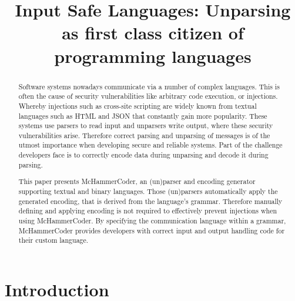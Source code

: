 \documentclass[conference]{IEEEtran}
\newcommand{\punchline}[1]{\textbf{Punch line: #1}}
\renewcommand{\punchline}[1]{}
\begin{document}
\title{Input Safe Languages: Unparsing as first class citizen of programming languages}

\author{
}


\maketitle

\IEEEpeerreviewmaketitle

\begin{abstract}
Software systems nowadays communicate via a number of complex languages.
This is often the cause of security vulnerabilities like arbitrary code execution, or injections.
Whereby injections such as cross-site scripting are widely known from textual languages such as HTML and JSON that constantly gain more popularity.
These systems use parsers to read input and unparsers write output, where these security vulnerabilities arise.
Therefore correct parsing and unparsing of messages is of the utmost importance when developing secure and reliable systems.
Part of the challenge developers face is to correctly encode data during unparsing and decode it during parsing.

This paper presents McHammerCoder, an (un)parser and encoding generator supporting textual and binary languages.
Those (un)parsers automatically apply the generated encoding, that is derived from the language's grammar.
Therefore manually defining and applying encoding is not required to effectively prevent injections when using McHammerCoder.
By specifying the communication language within a grammar, McHammerCoder provides developers with correct input and output handling code for their custom language.
\end{abstract}

\section{Introduction}
\punchline{String Concat is the problem}
\end{document}
